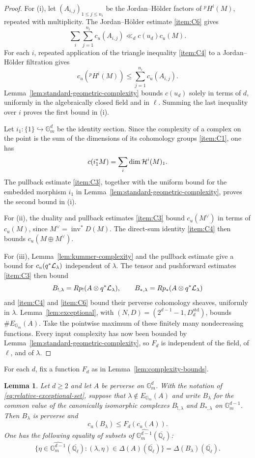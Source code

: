 \documentclass[12pt,reqno]{amsart}
\theoremstyle{definition}
\theoremstyle{plain}
\newtheorem{lem}[para]{Lemma}
\theoremstyle{definition}
\theoremstyle{remark}
\newcommand{\bbG}{\mathbb{G}}  \newcommand{\bbH}{\mathbb{H}}
\newcommand{\bbQ}{\mathbb{Q}}  \newcommand{\bbR}{\mathbb{R}}
\newcommand{\ol}[1]{\overline{#1}}
\newcommand{\Ql}{\bbQ_{\ell}}
\newcommand{\Gm}{\bbG_m}
\newcommand{\cu}{c_u}
\begin{document}
\begin{proof}
For (i), let \((A_{i,j})_{1\le j\le n_i}\) be the Jordan--H\"older factors of \({}^pH^i(M)\),
repeated with multiplicity.  The Jordan--H\"older estimate \ref{item:C6} gives
\[
        \sum_i\sum_{j=1}^{n_i}\cu(A_{i,j})
        \ll_d c(u_d)\cu(M).
\]
For each \(i\), repeated application of the triangle inequality \ref{item:C4} to a Jordan--H\"older
filtration gives
\[
        \cu({}^pH^i(M))\le\sum_{j=1}^{n_i}\cu(A_{i,j}).
\]
Lemma~\ref{lem:standard-geometric-complexity} bounds \(c(u_d)\) solely in terms of \(d\), uniformly in
the algebraically closed field and in \(\ell\).  Summing the last inequality over \(i\) proves the first
bound in (i).

Let \(i_1:\{1\}\hookrightarrow\Gm^d\) be the identity section.  Since the complexity of a complex on
the point is the sum of the dimensions of its cohomology groups \ref{item:C1}, one has
\[
        c(i_1^*M)=\sum_i\dim\mathcal{H}^i(M)_1.
\]
The pullback estimate \ref{item:C3}, together with the uniform bound for the embedded
morphism \(i_1\) in Lemma~\ref{lem:standard-geometric-complexity}, proves the second bound in (i).

For (ii), the duality and pullback estimates \ref{item:C3} bound
\(\cu(M^\vee)\) in terms of \(\cu(M)\), since \(M^\vee=\operatorname{inv}^*D(M)\).  The direct-sum
identity \ref{item:C4} then bounds \(\cu(M\oplus M^\vee)\).

For (iii), Lemma~\ref{lem:kummer-complexity} and the pullback estimate give a bound for
\(\cu(q^*\cL_\lambda)\) independent of \(\lambda\).  The tensor and pushforward estimates
\ref{item:C3} then bound
\[
        B_{!,\lambda}=Rp_!(A\otimes q^*\mathcal{L}_\lambda),\qquad
        B_{*,\lambda}=Rp_*(A\otimes q^*\mathcal{L}_\lambda)
\]
and \ref{item:C4} and \ref{item:C6} bound their perverse cohomology sheaves, uniformly in
\(\lambda\).  Lemma~\ref{lem:exceptional}, with \((N,D)=(2^{d-1}-1,D_d^{\mathrm{std}})\), bounds
\(\#E_{\Gm}(A)\).  Take the pointwise maximum of these finitely many nondecreasing functions.  Every input
complexity has now been bounded by Lemma~\ref{lem:standard-geometric-complexity}, so \(F_{d}\) is
independent of the field, of \(\ell\), and of \(\lambda\).
\end{proof}

For each \(d\), fix a function \(F_d\) as in Lemma~\ref{lem:complexity-bounds}.

\begin{lem}
\label{lem:fibre}
Let \(d\ge2\) and let \(A\) be perverse on \(\Gm^d\).  With the notation of
\eqref{eq:relative-exceptional-set}, suppose that \(\lambda\notin E_{\Gm}(A)\) and write \(B_\lambda\)
for the common value of the canonically isomorphic complexes \(B_{!,\lambda}\) and \(B_{*,\lambda}\) on
\(\Gm^{d-1}\).
Then \(B_\lambda\) is perverse and
\[
        \cu(B_\lambda)\le F_{d}(\cu(A)).
\]
One has the following equality of subsets of \(\widehat{\Gm^{d-1}}(\ol\Ql)\):
\[
        \{\eta\in\widehat{\Gm^{d-1}}(\ol\Ql):(\lambda,\eta)\in\Delta(A)(\ol\Ql)\}
        =\Delta(B_\lambda)(\ol\Ql).
\]
\end{lem}
\end{document}
